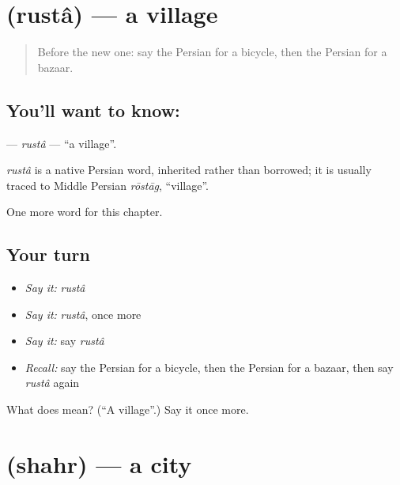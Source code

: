 \section[\texorpdfstring{\fa{روستا} (rustâ)}{روستا (rustâ)}]{ (rustâ) — a village}

\label{lesson:FA-C72-rusta}



\begin{quote}
Before the new one: say the Persian for a bicycle, then the Persian for a bazaar.
\end{quote}

\subsection*{You'll want to know: }
\textbf{} — \emph{rustâ} — \textquotedblleft{}a village\textquotedblright{}.

\begin{cousinweb}
\emph{rustâ} is a native Persian word, inherited rather than borrowed; it is usually traced to Middle Persian \emph{rōstāg}, \textquotedblleft{}village\textquotedblright{}.
\end{cousinweb}

\begin{grammarlens}[title={What you've built}]
One more word for this chapter.
\end{grammarlens}

\subsection*{Your turn}
\begin{itemize}
\raggedright
  \item \emph{Say it:} \emph{rustâ}
  \item \emph{Say it:} \emph{rustâ}, once more
  \item \emph{Say it:} say \emph{rustâ}
  \item \emph{Recall:} say the Persian for a bicycle, then the Persian for a bazaar, then say \emph{rustâ} again
\end{itemize}

\begin{tcolorbox}[breakable,colback=teal!4,colframe=teal!35!black,title={Before you move on}]
What does  mean? (\textquotedblleft{}A village\textquotedblright{}.) Say it once more.
\end{tcolorbox}
\section[\texorpdfstring{\fa{شهر} (shahr)}{شهر (shahr)}]{ (shahr) — a city}

